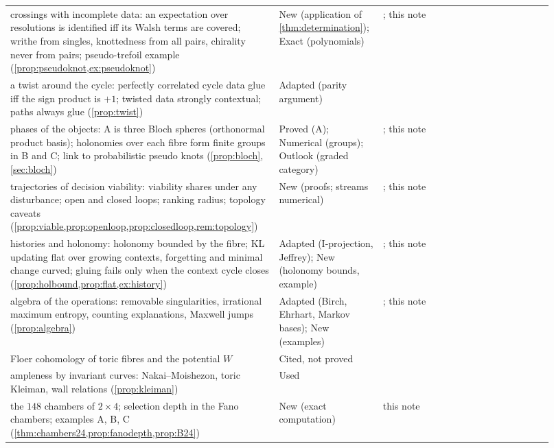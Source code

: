 \documentclass[11pt]{article}
\theoremstyle{definition}\newtheorem{definition}[theorem]{Definition}\newtheorem{remark}[theorem]{Remark}\newtheorem{example}[theorem]{Example}\newtheorem{problem}[theorem]{Open problem}\crefname{problem}{Problem}{Problems}
\begin{document}
{\begin{longtable}{p{0.46\linewidth}p{0.16\linewidth}p{0.3\linewidth}}
\rowcolor{stNew} crossings with incomplete data: an expectation over resolutions is identified iff its Walsh terms are covered; writhe from singles, knottedness from all pairs, chirality never from pairs; pseudo-trefoil example (\cref{prop:pseudoknot,ex:pseudoknot}) & New (application of \cref{thm:determination}); Exact (polynomials) & \cite{DiamantisKauffman2026}; this note\\
\rowcolor{stAdapted} a twist around the cycle: perfectly correlated cycle data glue iff the sign product is $+1$; twisted data strongly contextual; paths always glue (\cref{prop:twist}) & Adapted (parity argument) & \cite{AraujoEtAl2013,Mermin1990,HeuslerSchlummerUbben2020}\\
\rowcolor{stNew} phases of the objects: A is three Bloch spheres (orthonormal product basis); holonomies over each fibre form finite groups in B and C; link to probabilistic pseudo knots (\cref{prop:bloch}, \cref{sec:bloch}) & Proved (A); Numerical (groups); Outlook (graded category) & \cite{DiamantisKauffman2026}; this note\\
\rowcolor{stNew} trajectories of decision viability: viability shares under any disturbance; open and closed loops; ranking radius; topology caveats (\cref{prop:viable,prop:openloop,prop:closedloop,rem:topology}) & New (proofs; streams numerical) & \cite{Aubin1991,DiamantisKauffman2026}; this note\\
\rowcolor{stNew} histories and holonomy: holonomy bounded by the fibre; KL updating flat over growing contexts, forgetting and minimal change curved; gluing fails only when the context cycle closes (\cref{prop:holbound,prop:flat,ex:history}) & Adapted (I-projection, Jeffrey); New (holonomy bounds, example) & \cite{Csiszar1975,DiaconisZabell1982,TohmeCaterinaGangle2017}; this note\\
\rowcolor{stAdapted} algebra of the operations: removable singularities, irrational maximum entropy, counting explanations, Maxwell jumps (\cref{prop:algebra}) & Adapted (Birch, Ehrhart, Markov bases); New (examples) & \cite{DrtonSturmfelsSullivant2009,BeckRobins2015,DiaconisSturmfels1998}; this note\\
\rowcolor{stCited} Floer cohomology of toric fibres and the potential $W$ & Cited, not proved & \cite{ChoOh2006,FOOO2010}\\
\rowcolor{stUsed} ampleness by invariant curves: Nakai--Moishezon, toric Kleiman, wall relations (\cref{prop:kleiman}) & Used & \cite{Kleiman1966,CLS2011}\\
\rowcolor{stNew} the $148$ chambers of $2\times4$; selection depth in the Fano chambers; examples A, B, C (\cref{thm:chambers24,prop:fanodepth,prop:B24}) & New (exact computation) & this note\\

\end{longtable}}
\end{document}
